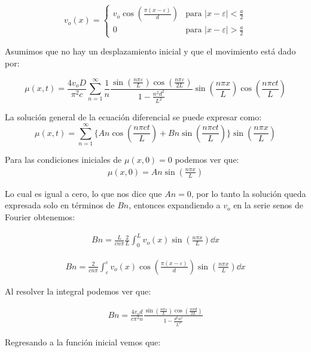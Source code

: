 \documentclass[11pt]{report}
\theoremstyle{plain}
\theoremstyle{definition}
\begin{document}
\begin{equation*}
	v_o(x)=
	\begin{cases}
		v_o\cos(\frac{\pi (x-\varepsilon)}{d}) & \text{para }|x-\varepsilon | < \frac{a}{2}\\
		0 & \text{para }|x-\varepsilon | > \frac{a}{2}
	\end{cases}
\end{equation*}

Asumimos que no hay un desplazamiento inicial y que el movimiento está dado por:

\begin{equation*}
	\mu(x,t)=\frac{4v_oD}{\pi^2 c}\sum^\infty_{n=1} \frac{1}{n}\frac{\sin(\frac{n\pi\varepsilon}{L})\cos(\frac{n\pi\varepsilon}{2L})}{1-\frac{n^2d^2}{L^2}}\sin(\frac{n\pi x}{L})\cos(\frac{n\pi ct}{L})
\end{equation*}

La solución general de la ecuación diferencial se puede expresar como:
\begin{equation*}
	\mu(x,t)=\sum^\infty_{n=1}\lbrace An\cos(\frac{n\pi ct}{L}) + Bn\sin(\frac{n\pi ct}{L})\rbrace\sin(\frac{n\pi x}{L})
\end{equation*}

Para las condiciones iniciales de $\mu(x,0) = 0$ podemos ver que:
\begin{align*}
	\mu(x,0) = An\sin(\frac{n\pi x}{L})
\end{align*}

Lo cual es igual a cero, lo que nos dice que $An = 0$, por lo tanto la solución queda expresada solo en términos de $Bn$, entonces expandiendo a $v_o$ en la serie senos de Fourier obtenemos:

\begin{align*}
	Bn = \frac{L}{cn\pi}\frac{2}{L}\int^L_0 v_o(x)\sin(\frac{n\pi x}{L})\dd{x}
\end{align*}

\begin{align*}
	Bn = \frac{2}{cn\pi}\int^{\varepsilon}_{	\varepsilon} v_o(x)\cos(\frac{\pi (x-\varepsilon)}{d})\sin(\frac{n\pi x}{L})\dd{x}
\end{align*}

Al resolver la integral podemos ver que:

\begin{align*}
	Bn = \frac{4v_od}{c\pi^2n}\frac{\sin(\frac{n\pi\varepsilon}{L})\cos(\frac{n\pi d}{2L})}{1-\frac{d^2n^2}{L^2}}
\end{align*}

Regresando a la función inicial vemos que:
\end{document}
